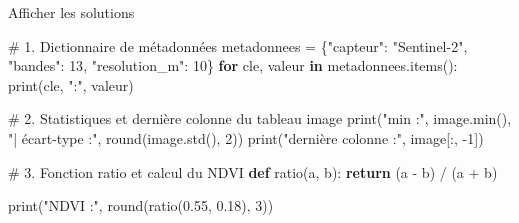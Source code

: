 \documentclass[
  french,
  11pt,
  letterpaper,
  open=any,
  twoside=false,
  french]{scrbook}
\newenvironment{Shaded}{\begin{snugshade}}{\end{snugshade}}
\newcommand{\BuiltInTok}[1]{\textcolor[rgb]{0.00,0.23,0.31}{#1}}
\newcommand{\CommentTok}[1]{\textcolor[rgb]{0.37,0.37,0.37}{#1}}
\newcommand{\ControlFlowTok}[1]{\textcolor[rgb]{0.00,0.23,0.31}{\textbf{#1}}}
\newcommand{\DecValTok}[1]{\textcolor[rgb]{0.68,0.00,0.00}{#1}}
\newcommand{\FloatTok}[1]{\textcolor[rgb]{0.68,0.00,0.00}{#1}}
\newcommand{\KeywordTok}[1]{\textcolor[rgb]{0.00,0.23,0.31}{\textbf{#1}}}
\newcommand{\NormalTok}[1]{\textcolor[rgb]{0.00,0.23,0.31}{#1}}
\newcommand{\OperatorTok}[1]{\textcolor[rgb]{0.37,0.37,0.37}{#1}}
\newcommand{\StringTok}[1]{\textcolor[rgb]{0.13,0.47,0.30}{#1}}
\begin{document}
Afficher les solutions

\begin{Shaded}
\begin{Highlighting}[]
\CommentTok{\# 1. Dictionnaire de métadonnées}
\NormalTok{metadonnees }\OperatorTok{=}\NormalTok{ \{}\StringTok{"capteur"}\NormalTok{: }\StringTok{"Sentinel{-}2"}\NormalTok{, }\StringTok{"bandes"}\NormalTok{: }\DecValTok{13}\NormalTok{, }\StringTok{"resolution\_m"}\NormalTok{: }\DecValTok{10}\NormalTok{\}}
\ControlFlowTok{for}\NormalTok{ cle, valeur }\KeywordTok{in}\NormalTok{ metadonnees.items():}
    \BuiltInTok{print}\NormalTok{(cle, }\StringTok{":"}\NormalTok{, valeur)}

\CommentTok{\# 2. Statistiques et dernière colonne du tableau \textasciigrave{}image\textasciigrave{}}
\BuiltInTok{print}\NormalTok{(}\StringTok{"min :"}\NormalTok{, image.}\BuiltInTok{min}\NormalTok{(), }\StringTok{"| écart{-}type :"}\NormalTok{, }\BuiltInTok{round}\NormalTok{(image.std(), }\DecValTok{2}\NormalTok{))}
\BuiltInTok{print}\NormalTok{(}\StringTok{"dernière colonne :"}\NormalTok{, image[:, }\OperatorTok{{-}}\DecValTok{1}\NormalTok{])}

\CommentTok{\# 3. Fonction ratio et calcul du NDVI}
\KeywordTok{def}\NormalTok{ ratio(a, b):}
    \ControlFlowTok{return}\NormalTok{ (a }\OperatorTok{{-}}\NormalTok{ b) }\OperatorTok{/}\NormalTok{ (a }\OperatorTok{+}\NormalTok{ b)}

\BuiltInTok{print}\NormalTok{(}\StringTok{"NDVI :"}\NormalTok{, }\BuiltInTok{round}\NormalTok{(ratio(}\FloatTok{0.55}\NormalTok{, }\FloatTok{0.18}\NormalTok{), }\DecValTok{3}\NormalTok{))}
\end{Highlighting}
\end{Shaded}
\end{document}
